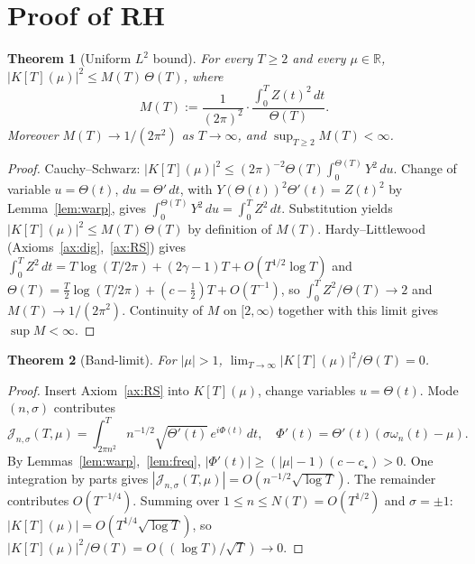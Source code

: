 \documentclass[11pt,a4paper]{article}
\theoremstyle{plain}
\newtheorem{theorem}{Theorem}
\theoremstyle{definition}
\newcommand{\R}{\mathbb{R}}
\begin{document}
\section{Proof of RH}

\begin{theorem}[Uniform $L^2$ bound]\label{thm:bdd}
For every $T\ge 2$ and every $\mu\in\R$, $|K[T](\mu)|^2\le M(T)\,\Theta(T)$, where
\[
M(T):=\frac{1}{(2\pi)^2}\cdot\frac{\int_0^T Z(t)^2\,dt}{\Theta(T)}.
\]
Moreover $M(T)\to 1/(2\pi^2)$ as $T\to\infty$, and $\sup_{T\ge 2}M(T)<\infty$.
\end{theorem}
\begin{proof}
Cauchy--Schwarz: $|K[T](\mu)|^2\le(2\pi)^{-2}\Theta(T)\int_0^{\Theta(T)}Y^2\,du$. Change of variable $u=\Theta(t)$, $du=\Theta'\,dt$, with $Y(\Theta(t))^2\Theta'(t)=Z(t)^2$ by Lemma~\ref{lem:warp}, gives $\int_0^{\Theta(T)}Y^2\,du=\int_0^T Z^2\,dt$. Substitution yields $|K[T](\mu)|^2\le M(T)\,\Theta(T)$ by definition of $M(T)$. Hardy--Littlewood (Axioms~\ref{ax:dig},~\ref{ax:RS}) gives $\int_0^T Z^2\,dt=T\log(T/2\pi)+(2\gamma-1)T+O(T^{1/2}\log T)$ and $\Theta(T)=\tfrac{T}{2}\log(T/2\pi)+(c-\tfrac12)T+O(T^{-1})$, so $\int_0^T Z^2/\Theta(T)\to 2$ and $M(T)\to 1/(2\pi^2)$. Continuity of $M$ on $[2,\infty)$ together with this limit gives $\sup M<\infty$.
\end{proof}

\begin{theorem}[Band-limit]\label{thm:band}
For $|\mu|>1$, $\lim_{T\to\infty}|K[T](\mu)|^2/\Theta(T)=0$.
\end{theorem}
\begin{proof}
Insert Axiom~\ref{ax:RS} into $K[T](\mu)$, change variables $u=\Theta(t)$. Mode $(n,\sigma)$ contributes
\[
\mathcal{J}_{n,\sigma}(T,\mu)=\int_{2\pi n^2}^{T}n^{-1/2}\sqrt{\Theta'(t)}\,e^{i\Phi(t)}\,dt,\quad\Phi'(t)=\Theta'(t)(\sigma\omega_n(t)-\mu).
\]
By Lemmas~\ref{lem:warp},~\ref{lem:freq}, $|\Phi'(t)|\ge(|\mu|-1)(c-c_\star)>0$. One integration by parts gives $|\mathcal{J}_{n,\sigma}(T,\mu)|=O(n^{-1/2}\sqrt{\log T})$. The remainder contributes $O(T^{-1/4})$. Summing over $1\le n\le N(T)=O(T^{1/2})$ and $\sigma=\pm 1$: $|K[T](\mu)|=O(T^{1/4}\sqrt{\log T})$, so $|K[T](\mu)|^2/\Theta(T)=O((\log T)/\sqrt{T})\to 0$.
\end{proof}
\end{document}
